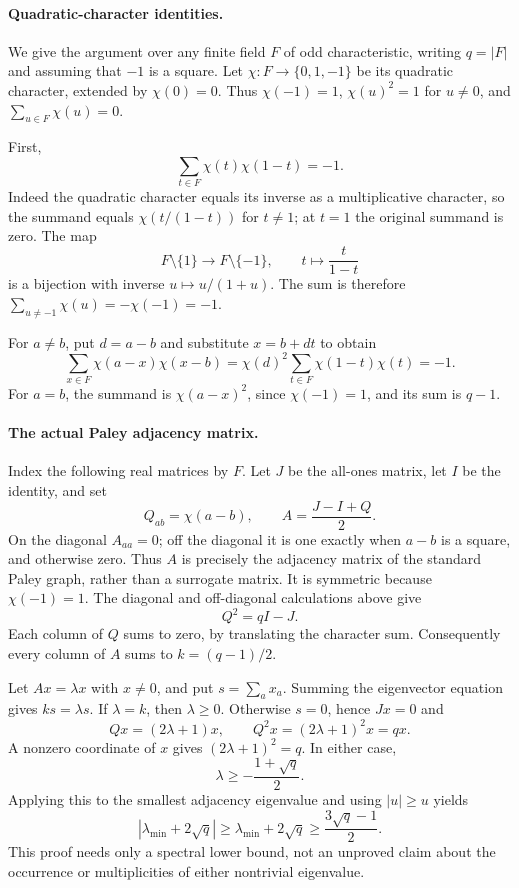 \documentclass[11pt]{article}
\begin{document}
\paragraph{Quadratic-character identities.}
We give the argument over any finite field $F$ of odd characteristic,
writing $q=|F|$ and assuming that $-1$ is a square. Let
$\chi:F\longrightarrow\{0,1,-1\}$ be its quadratic character, extended by
$\chi(0)=0$. Thus $\chi(-1)=1$, $\chi(u)^2=1$ for $u\ne0$, and
$\sum_{u\in F}\chi(u)=0$.

First,
\begin{equation}\label{eq:jacobi}
 \sum_{t\in F}\chi(t)\chi(1-t)=-1.
\end{equation}
Indeed the quadratic character equals its inverse as a multiplicative
character, so the summand equals $\chi(t/(1-t))$ for $t\ne1$; at $t=1$
the original summand is zero. The map
\[
 F\setminus\{1\}\longrightarrow F\setminus\{-1\},\qquad
 t\longmapsto\frac{t}{1-t}
\]
is a bijection with inverse $u\mapsto u/(1+u)$. The sum is therefore
$\sum_{u\ne-1}\chi(u)=-\chi(-1)=-1$.

For $a\ne b$, put $d=a-b$ and substitute $x=b+dt$ to obtain
\begin{equation}\label{eq:correlation}
 \sum_{x\in F}\chi(a-x)\chi(x-b)
 =\chi(d)^2\sum_{t\in F}\chi(1-t)\chi(t)=-1.
\end{equation}
For $a=b$, the summand is $\chi(a-x)^2$, since $\chi(-1)=1$, and its sum
is $q-1$.

\paragraph{The actual Paley adjacency matrix.}
Index the following real matrices by $F$. Let $J$ be the all-ones matrix,
let $I$ be the identity, and set
\[
 Q_{ab}=\chi(a-b),\qquad A=\frac{J-I+Q}{2}.
\]
On the diagonal $A_{aa}=0$; off the diagonal it is one exactly when
$a-b$ is a square, and otherwise zero. Thus $A$ is precisely the adjacency
matrix of the standard Paley graph, rather than a surrogate matrix.
It is symmetric because $\chi(-1)=1$.
The diagonal and off-diagonal calculations above give
\begin{equation}\label{eq:matrix}
 Q^2=qI-J.
\end{equation}
Each column of $Q$ sums to zero, by translating the character sum.
Consequently every column of $A$ sums to $k=(q-1)/2$.

Let $Ax=\lambda x$ with $x\ne0$, and put $s=\sum_a x_a$.
Summing the eigenvector equation gives $ks=\lambda s$. If $\lambda=k$,
then $\lambda\geq0$. Otherwise $s=0$, hence $Jx=0$ and
\[
 Qx=(2\lambda+1)x,\qquad
 Q^2x=(2\lambda+1)^2x=qx.
\]
A nonzero coordinate of $x$ gives $(2\lambda+1)^2=q$. In either case,
\begin{equation}\label{eq:lower}
 \lambda\geq-\frac{1+\sqrt q}{2}.
\end{equation}
Applying this to the smallest adjacency eigenvalue and using $|u|\geq u$
yields
\[
 |\lambda_{\min}+2\sqrt q|\geq\lambda_{\min}+2\sqrt q
 \geq\frac{3\sqrt q-1}{2}.
\]
This proof needs only a spectral lower bound, not an unproved claim about
the occurrence or multiplicities of either nontrivial eigenvalue.
\end{document}
